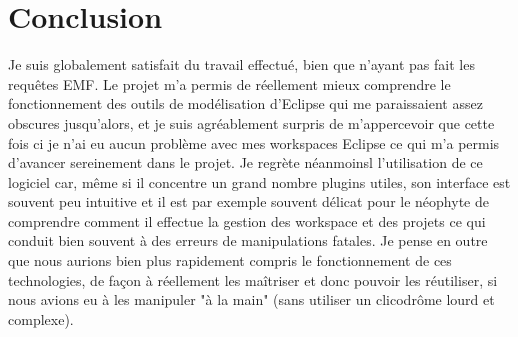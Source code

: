 \documentclass[12pt]{article}
\begin{document}
\section{Conclusion}
Je suis globalement satisfait du travail effectué, bien que n'ayant pas fait les requêtes EMF. Le projet m'a permis de réellement mieux comprendre le fonctionnement des outils de modélisation d'Eclipse qui me paraissaient assez obscures jusqu'alors, et je suis agréablement surpris de m'appercevoir que cette fois ci je n'ai eu aucun problème avec mes workspaces Eclipse ce qui m'a permis d'avancer sereinement dans le projet.
Je regrète néanmoinsl l'utilisation de ce logiciel car, même si il concentre un grand nombre plugins utiles, son interface est souvent peu intuitive et il est par exemple souvent délicat pour le néophyte de comprendre comment il effectue la gestion des workspace et des projets ce qui conduit bien souvent à des erreurs de manipulations fatales. Je pense en outre que nous aurions bien plus rapidement compris le fonctionnement de ces technologies, de façon à réellement les maîtriser et donc pouvoir les réutiliser, si nous avions eu à les manipuler "à la main" (sans utiliser un clicodrôme lourd et complexe).
\end{document}
